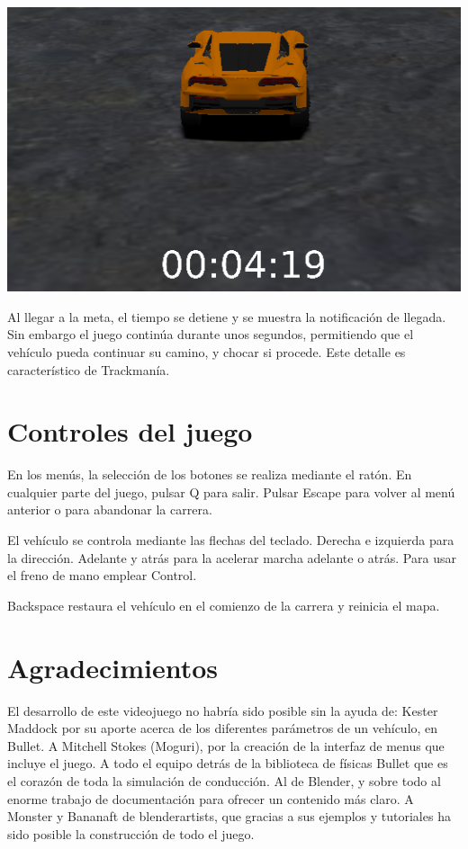 \documentclass[11pt,a4paper,hidelinks]{article}
\begin{document}
\begin{center}
\includegraphics[scale=0.5]{hud}
\end{center}

Al llegar a la meta, el tiempo se detiene y se muestra la notificación de 
llegada. Sin embargo el juego continúa durante unos segundos, permitiendo que el 
vehículo pueda continuar su camino, y chocar si procede. Este detalle es 
característico de Trackmanía.

\section{Controles del juego}
En los menús, la selección de los botones se realiza mediante el ratón. En 
cualquier parte del juego, pulsar Q para salir. Pulsar Escape para volver al
menú anterior o para abandonar la carrera.

El vehículo se controla mediante las flechas del teclado. Derecha e izquierda 
para la dirección. Adelante y atrás para la acelerar marcha adelante o atrás.  
Para usar el freno de mano emplear Control.

Backspace restaura el vehículo en el comienzo de la carrera y reinicia el mapa.


\section{Agradecimientos}
El desarrollo de este videojuego no habría sido posible sin la ayuda de:
Kester Maddock por su aporte acerca de los diferentes parámetros de un vehículo, 
en Bullet. A Mitchell Stokes (Moguri), por la creación de la interfaz de menus 
que incluye el juego. A todo el equipo detrás de la biblioteca de físicas Bullet 
que es el corazón de toda la simulación de conducción. Al de Blender, y sobre 
todo al enorme trabajo de documentación para ofrecer un contenido más claro. A 
Monster y Bananaft de blenderartists, que gracias a sus ejemplos y tutoriales ha 
sido posible la construcción de todo el juego.
\end{document}
